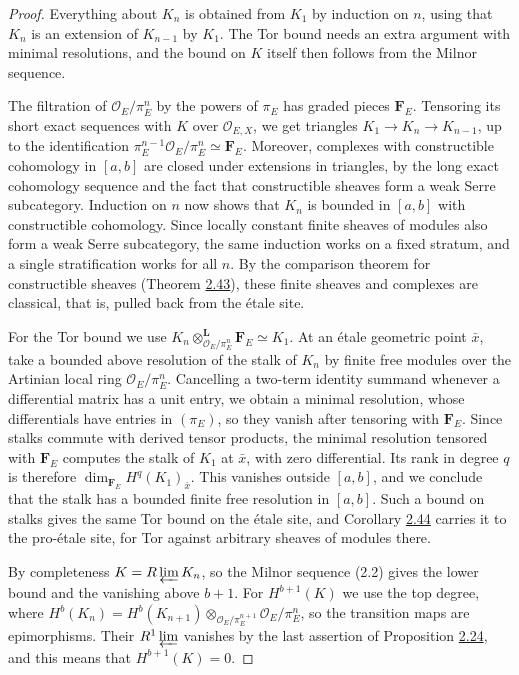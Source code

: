 \documentclass[11pt]{article}
\begin{document}
\begin{proof}[{Proof}]\label{bp209}%
Everything about \(K_n\) is obtained from \(K_1\) by induction on \(n\), using that \(K_n\) is an extension of \(K_{n-1}\) by \(K_1\). The Tor bound needs an extra argument with minimal resolutions, and the bound on \(K\) itself then follows from the Milnor sequence.

The filtration of \(\mathcal O_E/\pi_E^n\) by the powers of \(\pi_E\) has graded pieces \(\mathbf F_E\). Tensoring its short exact sequences with \(K\) over \(\mathcal O_{E,X}\), we get triangles \(K_1\to K_{n}\to K_{n-1}\), up to the identification \(\pi_E^{n-1}\mathcal O_E/\pi_E^n\simeq\mathbf F_E\). Moreover, complexes with constructible cohomology in \([a,b]\) are closed under extensions in triangles, by the long exact cohomology sequence and the fact that constructible sheaves form a weak Serre subcategory. Induction on \(n\) now shows that \(K_n\) is bounded in \([a,b]\) with constructible cohomology. Since locally constant finite sheaves of modules also form a weak Serre subcategory, the same induction works on a fixed stratum, and a single stratification works for all \(n\). By the comparison theorem for constructible sheaves (Theorem \hyperref[bp129]{2.43}), these finite sheaves and complexes are classical, that is, pulled back from the étale site.

For the Tor bound we use \(K_n\otimes^{\mathbf L}_{\mathcal O_E/\pi_E^n}\mathbf F_E\simeq K_1\). At an étale geometric point \(\bar x\), take a bounded above resolution of the stalk of \(K_n\) by finite free modules over the Artinian local ring \(\mathcal O_E/\pi_E^n\). Cancelling a two-term identity summand whenever a differential matrix has a unit entry, we obtain a minimal resolution, whose differentials have entries in \((\pi_E)\), so they vanish after tensoring with \(\mathbf F_E\). Since stalks commute with derived tensor products, the minimal resolution tensored with \(\mathbf F_E\) computes the stalk of \(K_1\) at \(\bar x\), with zero differential. Its rank in degree \(q\) is therefore \(\dim_{\mathbf F_E}H^q(K_1)_{\bar x}\). This vanishes outside \([a,b]\), and we conclude that the stalk has a bounded finite free resolution in \([a,b]\). Such a bound on stalks gives the same Tor bound on the étale site, and Corollary \hyperref[bp132]{2.44} carries it to the pro-étale site, for Tor against arbitrary sheaves of modules there.

By completeness \(K=R\varprojlim K_n\), so the Milnor sequence (2.2) gives the lower bound and the vanishing above \(b+1\). For \(H^{b+1}(K)\) we use the top degree, where \(H^b(K_n)=H^b(K_{n+1})\otimes_{\mathcal O_E/\pi_E^{n+1}}\mathcal O_E/\pi_E^n\), so the transition maps are epimorphisms. Their \(R^1\varprojlim\) vanishes by the last assertion of Proposition \hyperref[bp71]{2.24}, and this means that \(H^{b+1}(K)=0\).
\end{proof}
\end{document}
